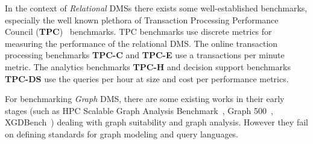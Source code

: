 \documentclass{llncs}
\begin{document}
    In the context of \textit{Relational} DMSs there exists some well-established benchmarks, especially the well known plethora of Transaction Processing Performance Council (\textbf{TPC})~\cite{Nambiar2011} benchmarks.
    TPC benchmarks use discrete metrics for measuring the performance of the relational DMS. The online transaction processing benchmarks \textbf{TPC-C} and \textbf{TPC-E} use a transactions per minute metric. The analytics benchmarks \textbf{TPC-H} and decision support benchmarks \textbf{TPC-DS} use the queries per hour at size and cost per performance metrics.
    
    For benchmarking \textit{Graph} DMS, there are some existing works in their early stages (such as HPC Scalable Graph Analysis Benchmark~\cite{Dominguez-Sal:2010:SGD:1927585.1927590}, Graph 500~\cite{murphy2010introducing}, XGDBench~\cite{conf/cloudcom/DayarathnaS12}) dealing with graph suitability and graph analysis. However they fail on defining standards for graph modeling and query languages.
    
\end{document}
